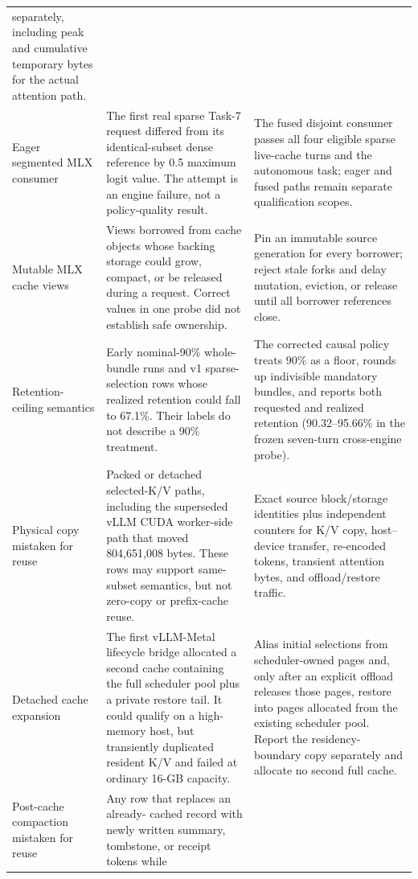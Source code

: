 \documentclass[11pt]{article}
\begin{document}
\begin{longtable}{@{}p{}p{}p{}@{}}
separately, including peak and cumulative temporary bytes for the actual
attention path. \\
\addlinespace
Eager segmented MLX consumer & The first real sparse Task-7 request differed
from its identical-subset dense reference by 0.5 maximum logit value.  The
attempt is an engine failure, not a policy-quality result. & The fused disjoint
consumer passes all four eligible sparse live-cache turns and the autonomous
task; eager and fused paths remain separate qualification scopes. \\
\addlinespace
Mutable MLX cache views & Views borrowed from cache objects whose backing
storage could grow, compact, or be released during a request.  Correct values
in one probe did not establish safe ownership. & Pin an immutable source
generation for every borrower; reject stale forks and delay mutation, eviction,
or release until all borrower references close. \\
\addlinespace
Retention-ceiling semantics & Early nominal-90\% whole-bundle runs and v1
sparse-selection rows whose realized retention could fall to 67.1\%.  Their
labels do not describe a 90\% treatment. & The corrected causal policy treats
90\% as a floor, rounds up indivisible mandatory bundles, and reports both
requested and realized retention (90.32--95.66\% in the frozen seven-turn
cross-engine probe). \\
\addlinespace
Physical copy mistaken for reuse & Packed or detached selected-K/V paths,
including the superseded vLLM CUDA worker-side path that moved 804,651,008
bytes.  These rows may support same-subset semantics, but not zero-copy or
prefix-cache reuse. & Exact source block/storage identities plus independent
counters for K/V copy, host--device transfer, re-encoded tokens, transient
attention bytes, and offload/restore traffic. \\
\addlinespace
Detached cache expansion & The first vLLM-Metal lifecycle bridge allocated a
second cache containing the full scheduler pool plus a private restore tail.
It could qualify on a high-memory host, but transiently duplicated resident
K/V and failed at ordinary 16-GB capacity. & Alias initial selections from
scheduler-owned pages and, only after an explicit offload releases those
pages, restore into pages allocated from the existing scheduler pool.  Report
the residency-boundary copy separately and allocate no second full cache. \\
\addlinespace
Post-cache compaction mistaken for reuse & Any row that replaces an already-
cached record with newly written summary, tombstone, or receipt tokens while

\end{longtable}
\end{document}
